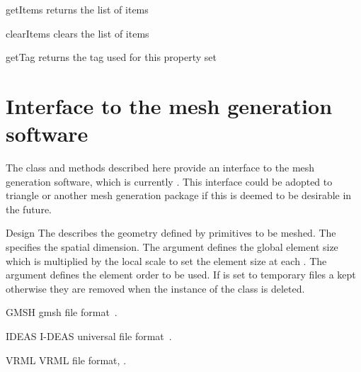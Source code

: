 \begin{methoddesc}[PropertySet]{getItems}{}
returns the list of items
\end{methoddesc}

\begin{methoddesc}[PropertySet]{clearItems}{}
clears the list of items 
\end{methoddesc}

\begin{methoddesc}[PropertySet]{getTag}{}
returns the tag used for this property set
\end{methoddesc}

\section{Interface to the mesh generation software}

The class and methods described here provide an interface to the mesh
generation software, which is currently \gmshextern.  This interface could be
adopted to triangle or another mesh generation package if this is
deemed to be desirable in the future.

\begin{classdesc}{Design}{
}
The  describes the geometry defined by primitives to be meshed.
The  specifies the spatial dimension. The argument  defines the global
element size which is multiplied by the local scale to set the element size at each \Point. 
The argument  defines the element order to be used. If  is set to 
\True temporary files a kept otherwise they are removed when the instance of the class is deleted. 
\end{classdesc}


\begin{memberdesc}[Design]{GMSH}
gmsh file format~\cite{GMSH}. 
\end{memberdesc}

\begin{memberdesc}[Design]{IDEAS}
I-DEAS universal file format~\cite{IDEAS}. 
\end{memberdesc}

\begin{memberdesc}[Design]{VRML}
VRML file format, \cite{VRML}. 
\end{memberdesc}

